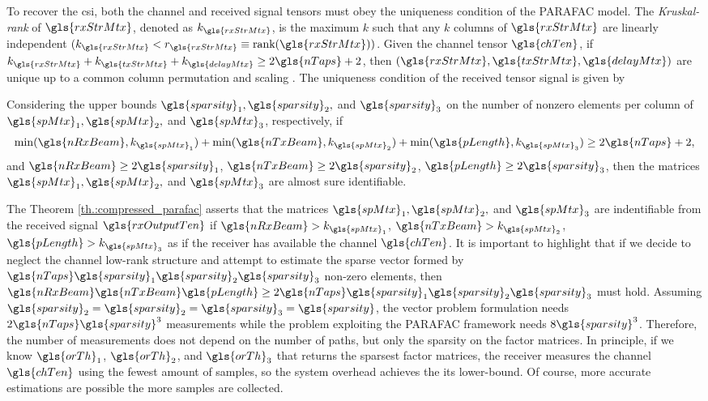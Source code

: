 \documentclass[conference]{IEEEtran}
\begin{document}
To recover the \gls{csi}, both the channel and
received signal tensors must obey the uniqueness condition of the
\gls{PARAFAC} model. The \textit{Kruskal-rank} of $\gls{rxStrMtx}$, denoted as
$k_{\gls{rxStrMtx}}$, is the maximum $k$ such that any $k$ columns of
$\gls{rxStrMtx}$ are linearly independent $(k_{\gls{rxStrMtx}} <
r_{\gls{rxStrMtx}} \equiv \textrm{rank}(\gls{rxStrMtx}) ) $. Given the channel
tensor $\gls{chTen}$, if
$k_{\gls{rxStrMtx}}+k_{\gls{txStrMtx}}+k_{\gls{delayMtx}} \geq 2\gls{nTaps} +
2$, then $(\gls{rxStrMtx},\gls{txStrMtx},\gls{delayMtx})$ are unique up to a
common column permutation and scaling \cite{Sidiropoulos:2000}. The uniqueness
condition of the received tensor signal is given by \cite{Sidiropoulos:2012}
\begin{theorem}
  \label{th.:compressed_parafac}
    Considering the upper bounds $\gls{sparsity}_1,\gls{sparsity}_2,$ and
    $\gls{sparsity}_3$ on the number of nonzero elements per column of
    $\gls{spMtx}_1, \gls{spMtx}_2,$ and $\gls{spMtx}_3$, respectively, if
    \begin{equation}
      \label{eq.uniqueness_compress_parafac}
      \min (\gls{nRxBeam},k_{\gls{spMtx}_1}) +\min (\gls{nTxBeam},k_{\gls{spMtx}_2}) + \min (\gls{pLength},k_{\gls{spMtx}_3}) \geq 2\gls{nTaps} + 2,
    \end{equation}
    and $\gls{nRxBeam} \geq 2 \gls{sparsity}_1$, $\gls{nTxBeam} \geq 2
    \gls{sparsity}_2$, $\gls{pLength} \geq 2 \gls{sparsity}_3$, then the
    matrices $\gls{spMtx}_1, \gls{spMtx}_2,$ and $\gls{spMtx}_3$ are almost sure identifiable.
\end{theorem}

The Theorem \ref{th.:compressed_parafac} asserts that the matrices
$\gls{spMtx}_1, \gls{spMtx}_2,$ and $\gls{spMtx}_3$ are indentifiable from the
received signal $\gls{rxOutputTen}$ if $\gls{nRxBeam}>k_{\gls{spMtx}_1}$,
$\gls{nTxBeam}>k_{\gls{spMtx}_2}$, $\gls{pLength}>k_{\gls{spMtx}_3}$ as if the
receiver has available the channel $\gls{chTen}$. It is important to highlight
that if we decide to neglect the channel low-rank structure and attempt to
estimate the sparse vector formed by $\gls{nTaps} \gls{sparsity}_1
\gls{sparsity}_2 \gls{sparsity}_3$ non-zero elements, then
$\gls{nRxBeam}\gls{nTxBeam}\gls{pLength} \geq 2 \gls{nTaps}\gls{sparsity}_1\gls{sparsity}_2\gls{sparsity}_3$
must hold. Assuming
$\gls{sparsity}_2=\gls{sparsity}_2=\gls{sparsity}_3=\gls{sparsity}$, the vector
problem formulation needs $2\gls{nTaps}\gls{sparsity}^3$ measurements while the
problem exploiting the \gls{PARAFAC} framework needs $8\gls{sparsity}^3$.
Therefore, the number of measurements does not depend on the number of paths,
but only the sparsity on the factor matrices. In principle, if we know
$\gls{orTh}_1$, $\gls{orTh}_2$, and $\gls{orTh}_3$ that returns the sparsest
factor matrices, the receiver  measures the channel  $\gls{chTen}$ using the fewest
amount of samples, so the system overhead achieves the its lower-bound. Of
course, more accurate estimations are possible the more samples are collected.
\end{document}
